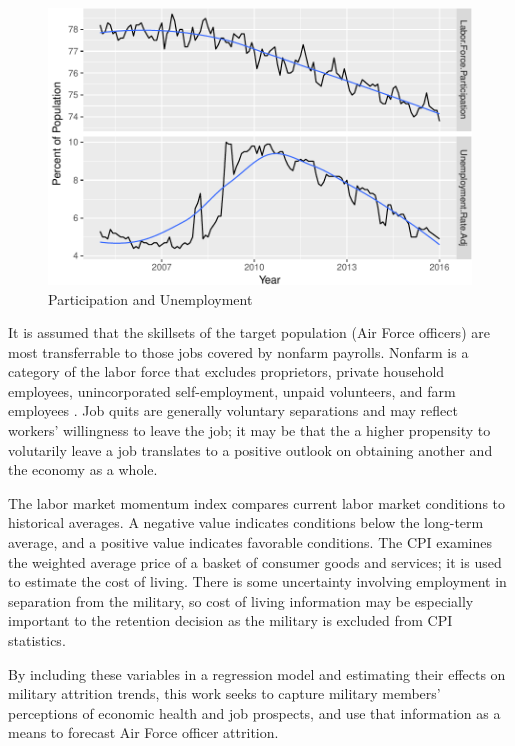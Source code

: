 \documentclass[12pt,letterpaper,toc=flat,oneside]{report}
\theoremstyle{definition}
\theoremstyle{definition}
\theoremstyle{definition}
\theoremstyle{remark}
\begin{document}
\begin{figure}[H]

{\centering \includegraphics{elliott-econometric-personnel-retention-18_files/figure-latex/lfpr-unemployment-1} 

}

\caption{Participation and Unemployment}\label{fig:lfpr-unemployment}
\end{figure}

It is assumed that the skillsets of the target population (Air Force
officers) are most transferrable to those jobs covered by nonfarm
payrolls. Nonfarm is a category of the labor force that excludes
proprietors, private household employees, unincorporated
self-employment, unpaid volunteers, and farm employees
\cite{fred-nonfarm-2017}. Job quits are generally voluntary separations
and may reflect workers' willingness to leave the job; it may be that
the a higher propensity to volutarily leave a job translates to a
positive outlook on obtaining another and the economy as a whole.

The labor market momentum index compares current labor market conditions
to historical averages. A negative value indicates conditions below the
long-term average, and a positive value indicates favorable conditions.
The CPI examines the weighted average price of a basket of consumer
goods and services; it is used to estimate the cost of living. There is
some uncertainty involving employment in separation from the military,
so cost of living information may be especially important to the
retention decision as the military is excluded from CPI statistics.

By including these variables in a regression model and estimating their
effects on military attrition trends, this work seeks to capture
military members' perceptions of economic health and job prospects, and
use that information as a means to forecast Air Force officer attrition.
\end{document}
